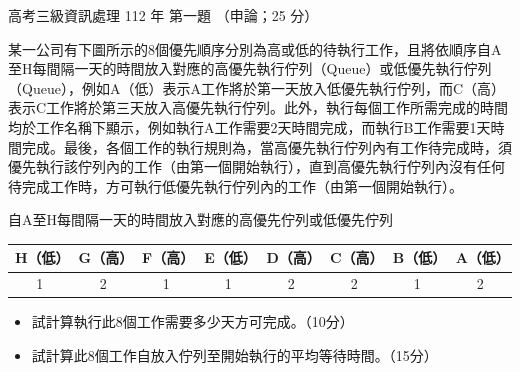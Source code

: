 \begin{pastexam}[label={px:gk3-112-ds-01}]{高考三級資訊處理 112 年 第一題}
（申論；25 分）

某一公司有下圖所示的8個優先順序分別為高或低的待執行工作，且將依順序自A至H每間隔一天的時間放入對應的高優先執行佇列（Queue）或低優先執行佇列（Queue），例如A（低）表示A工作將於第一天放入低優先執行佇列，而C（高）表示C工作將於第三天放入高優先執行佇列。此外，執行每個工作所需完成的時間均於工作名稱下顯示，例如執行A工作需要2天時間完成，而執行B工作需要1天時間完成。最後，各個工作的執行規則為，當高優先執行佇列內有工作待完成時，須優先執行該佇列內的工作（由第一個開始執行），直到高優先執行佇列內沒有任何待完成工作時，方可執行低優先執行佇列內的工作（由第一個開始執行）。

\begin{center}
自A至H每間隔一天的時間放入對應的高優先佇列或低優先佇列\\[2pt]
\small\renewcommand{\arraystretch}{1.2}\setlength{\tabcolsep}{4pt}
\begin{tabular}{|*{8}{c|}}
\hline
H（低）& G（高）& F（高）& E（低）& D（高）& C（高）& B（低）& A（低）\\ \hline
1 & 2 & 1 & 1 & 2 & 2 & 1 & 2 \\ \hline
\end{tabular}
\end{center}
\begin{itemize}[leftmargin=2.2em]
\item[㈠] 試計算執行此8個工作需要多少天方可完成。（10分）
\item[㈡] 試計算此8個工作自放入佇列至開始執行的平均等待時間。（15分）
\end{itemize}
\end{pastexam}

